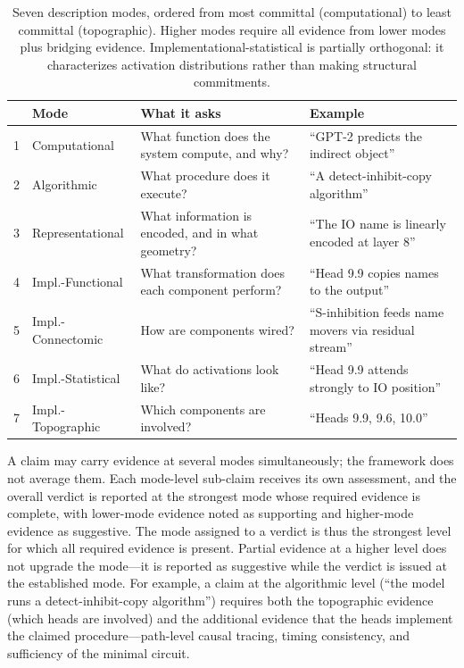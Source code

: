 \documentclass{article}
\begin{document}
\begin{table}[H]
\centering
\small
\caption{Seven description modes, ordered from most committal (computational) to least committal (topographic). Higher modes require all evidence from lower modes plus bridging evidence. Implementational-statistical is partially orthogonal: it characterizes activation distributions rather than making structural commitments.}
\label{tab:modes}
\renewcommand{\arraystretch}{1.2}
\begin{tabular}{@{}rl>{\raggedright\arraybackslash}p{4.8cm}>{\raggedright\arraybackslash}p{5.2cm}@{}}
\toprule
& \textbf{Mode} & \textbf{What it asks} & \textbf{Example} \\
\midrule
1 & Computational & What function does the system compute, and why? & ``GPT-2 predicts the indirect object'' \\
\midrule
2 & Algorithmic & What procedure does it execute? & ``A detect-inhibit-copy algorithm'' \\
\midrule
3 & Representational & What information is encoded, and in what geometry? & ``The IO name is linearly encoded at layer 8'' \\
\midrule
4 & Impl.-Functional & What transformation does each component perform? & ``Head 9.9 copies names to the output'' \\
\midrule
5 & Impl.-Connectomic & How are components wired? & ``S-inhibition feeds name movers via residual stream'' \\
\midrule
6 & Impl.-Statistical & What do activations look like? & ``Head 9.9 attends strongly to IO position'' \\
\midrule
7 & Impl.-Topographic & Which components are involved? & ``Heads 9.9, 9.6, 10.0'' \\
\bottomrule
\end{tabular}
\end{table}

A claim may carry evidence at several modes simultaneously; the framework does not average them. Each mode-level sub-claim receives its own assessment, and the overall verdict is reported at the strongest mode whose required evidence is complete, with lower-mode evidence noted as supporting and higher-mode evidence as suggestive. The mode assigned to a verdict is thus the strongest level for which all required evidence is present. Partial evidence at a higher level does not upgrade the mode---it is reported as suggestive while the verdict is issued at the established mode. For example, a claim at the algorithmic level (``the model runs a detect-inhibit-copy algorithm'') requires both the topographic evidence (which heads are involved) and the additional evidence that the heads implement the claimed procedure---path-level causal tracing, timing consistency, and sufficiency of the minimal circuit.
\end{document}
